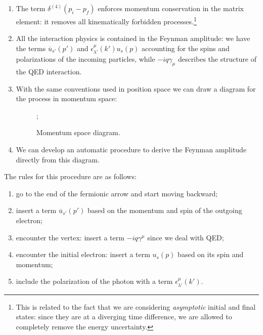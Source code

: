 \documentclass[main.tex]{subfiles}
\begin{document}
\begin{enumerate}
    \item The term \(\delta^{(4)}(p _{i} - p _{f})\) enforces momentum conservation in the matrix element: it removes all kinematically forbidden processes.\footnote{This is related to the fact that we are considering \emph{asymptotic} initial and final states: since they are at a diverging time difference, we are allowed to completely remove the energy uncertainty. }
    \item All the interaction physics is contained in the Feynman amplitude: we have the terms \(\overline{u}_{s'} (p')\) and \(\epsilon^{\mu }_{\lambda '} (k ') u_s (p)\) accounting for the spins and polarizations of the incoming particles, while \(-i q \gamma_{\mu }\) describes the structure of the QED interaction. 
    \item With the same conventions used in position space we can draw a diagram for the process in momentum space: 
    \begin{figure}[ht]
    \centering
    ;
    \caption{Momentum space diagram.}   
    \label{fig:eegamma-interaction}
    \end{figure}
    \item We can develop an automatic procedure to derive the Feynman amplitude directly from this diagram. 
\end{enumerate}

The rules for this procedure are as follows: 
\begin{enumerate}
    \item go to the end of the fermionic arrow and start moving backward;
    \item insert a term \(\overline{u}_{s'} (p')\) based on the momentum and spin of the outgoing electron; 
    \item encounter the vertex: insert a term \(-iq \gamma^{\mu }\) since we deal with QED;
    \item encounter the initial electron: insert a term \(u_s (p)\) based on its spin and momentum;
    \item include the polarization of the photon  with a term \(\epsilon^{\mu }_{\lambda '} (k')\).
\end{enumerate}
\end{document}
